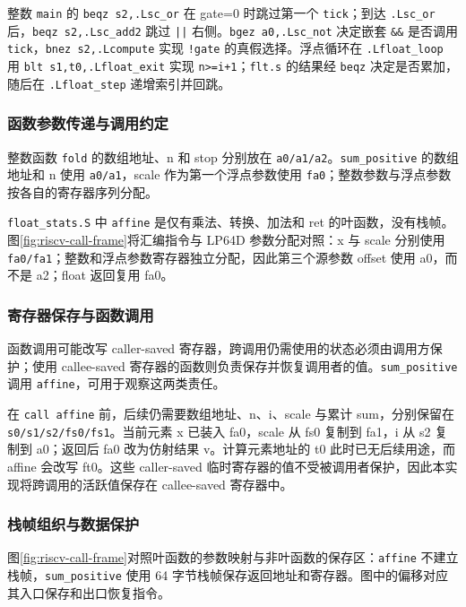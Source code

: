 整数 \texttt{main} 的 \texttt{beqz s2,.Lsc\_or} 在 gate=0 时跳过第一个 \texttt{tick}；到达 \texttt{.Lsc\_or} 后，\texttt{beqz s2,.Lsc\_add2} 跳过 \texttt{||} 右侧。\texttt{bgez a0,.Lsc\_not} 决定嵌套 \texttt{\&\&} 是否调用 \texttt{tick}，\texttt{bnez s2,.Lcompute} 实现 \texttt{!gate} 的真假选择。浮点循环在 \texttt{.Lfloat\_loop} 用 \texttt{blt s1,t0,.Lfloat\_exit} 实现 \texttt{n>=i+1}；\texttt{flt.s} 的结果经 \texttt{beqz} 决定是否累加，随后在 \texttt{.Lfloat\_step} 递增索引并回跳。

\subsubsection{函数参数传递与调用约定}
\label{sec:sysy-riscv-parameters}
整数函数 \texttt{fold} 的数组地址、n 和 stop 分别放在 \texttt{a0/a1/a2}。\texttt{sum\_positive} 的数组地址和 n 使用 \texttt{a0/a1}，scale 作为第一个浮点参数使用 \texttt{fa0}；整数参数与浮点参数按各自的寄存器序列分配。

\texttt{float\_stats.S} 中 \texttt{affine} 是仅有乘法、转换、加法和 ret 的叶函数，没有栈帧。图\ref{fig:riscv-call-frame}将汇编指令与 LP64D 参数分配对照：x 与 scale 分别使用 \texttt{fa0/fa1}；整数和浮点参数寄存器独立分配，因此第三个源参数 offset 使用 a0，而不是 a2；float 返回复用 fa0\cite{riscvabi}。

\subsubsection{寄存器保存与函数调用}
\label{sec:sysy-riscv-save}
函数调用可能改写 caller-saved 寄存器，跨调用仍需使用的状态必须由调用方保护；使用 callee-saved 寄存器的函数则负责保存并恢复调用者的值。\texttt{sum\_positive} 调用 \texttt{affine}，可用于观察这两类责任。

在 \texttt{call affine} 前，后续仍需要数组地址、n、i、scale 与累计 sum，分别保留在 \texttt{s0/s1/s2/fs0/fs1}。当前元素 x 已装入 fa0，scale 从 fs0 复制到 fa1，i 从 s2 复制到 a0；返回后 fa0 改为仿射结果 v。计算元素地址的 t0 此时已无后续用途，而 affine 会改写 ft0。这些 caller-saved 临时寄存器的值不受被调用者保护，因此本实现将跨调用的活跃值保存在 callee-saved 寄存器中。

\subsubsection{栈帧组织与数据保护}
\label{sec:sysy-riscv-frame}
图\ref{fig:riscv-call-frame}对照叶函数的参数映射与非叶函数的保存区：\texttt{affine} 不建立栈帧，\texttt{sum\_positive} 使用 64 字节栈帧保存返回地址和寄存器。图中的偏移对应其入口保存和出口恢复指令。

